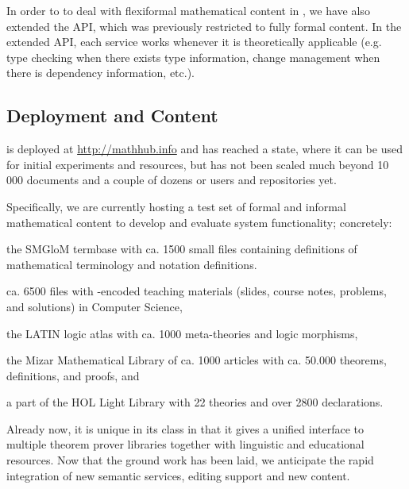 In order to to deal with flexiformal mathematical content in \omdoc, we have also extended
the \mmt API, which was previously restricted to fully formal content. In the extended
\mmt API, each \mmt service works whenever it is theoretically applicable (e.g. type
checking when there exists type information, change management when there is dependency
information, etc.).

\subsection{Deployment and Content}

\sys is deployed at \url{http://mathhub.info} and has reached a state, where it can be
used for initial experiments and resources, but has not been scaled much beyond 10\,000
documents and a couple of dozens or users and repositories yet.

Specifically, we are currently hosting a test set of formal and informal mathematical
content to develop and evaluate system functionality; concretely:
\begin{compactenum}[\em i\rm)]
\item the SMGloM termbase with ca. 1500 small \sTeX files containing definitions of
  mathematical terminology and notation definitions.
\item ca. 6500 files with \sTeX-encoded teaching materials (slides, course notes,
  problems, and solutions) in Computer Science,
\item the LATIN logic atlas with ca. 1000 meta-theories and logic morphisms,
\item the Mizar Mathematical Library of ca. 1000 articles with ca. 50.000 theorems,
  definitions, and proofs, and
\item a part of the HOL Light Library with 22 theories and over 2800 declarations.
\end{compactenum}
Already now, it is unique in its class in that it gives a unified interface to multiple
theorem prover libraries together with linguistic and educational resources. Now that the
ground work has been laid, we anticipate the rapid integration of new semantic services,
editing support and new content.



